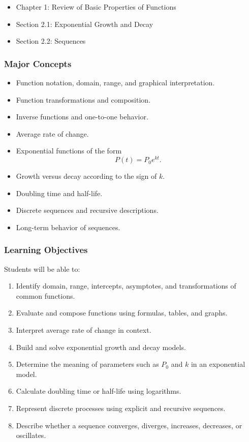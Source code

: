 \documentclass[11pt]{article}
\begin{document}
\begin{itemize}
    \item Chapter 1: Review of Basic Properties of Functions
    \item Section 2.1: Exponential Growth and Decay
    \item Section 2.2: Sequences
\end{itemize}

\subsubsection{Major Concepts}

\begin{itemize}
    \item Function notation, domain, range, and graphical interpretation.
    \item Function transformations and composition.
    \item Inverse functions and one-to-one behavior.
    \item Average rate of change.
    \item Exponential functions of the form
    \[
        P(t) = P_0 e^{kt}.
    \]
    \item Growth versus decay according to the sign of $k$.
    \item Doubling time and half-life.
    \item Discrete sequences and recursive descriptions.
    \item Long-term behavior of sequences.
\end{itemize}

\subsubsection{Learning Objectives}

Students will be able to:

\begin{enumerate}
    \item Identify domain, range, intercepts, asymptotes, and transformations of common functions.
    \item Evaluate and compose functions using formulas, tables, and graphs.
    \item Interpret average rate of change in context.
    \item Build and solve exponential growth and decay models.
    \item Determine the meaning of parameters such as $P_0$ and $k$ in an exponential model.
    \item Calculate doubling time or half-life using logarithms.
    \item Represent discrete processes using explicit and recursive sequences.
    \item Describe whether a sequence converges, diverges, increases, decreases, or oscillates.
\end{enumerate}
\end{document}
